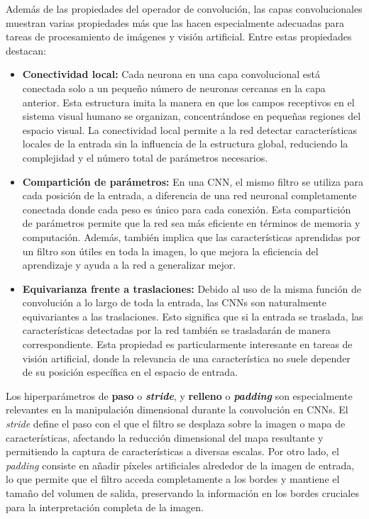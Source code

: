 Además de las propiedades del operador de convolución, las capas convolucionales muestran varias propiedades más que las hacen especialmente adecuadas para tareas de procesamiento de imágenes y visión artificial. Entre estas propiedades destacan:

\begin{itemize}
	\item \textbf{Conectividad local:}
	Cada neurona en una capa convolucional está conectada solo a un pequeño número de neuronas cercanas en la capa anterior. Esta estructura imita la manera en que los campos receptivos en el sistema visual humano se organizan, concentrándose en pequeñas regiones del espacio visual. La conectividad local permite a la red detectar características locales de la entrada sin la influencia de la estructura global, reduciendo la complejidad y el número total de parámetros necesarios.
	
	\item \textbf{Compartición de parámetros:}
	En una CNN, el mismo filtro se utiliza para cada posición de la entrada, a diferencia de una red neuronal completamente conectada donde cada peso es único para cada conexión. Esta compartición de parámetros permite que la red sea más eficiente en términos de memoria y computación. Además, también implica que las características aprendidas por un filtro son útiles en toda la imagen, lo que mejora la eficiencia del aprendizaje y ayuda a la red a generalizar mejor.
	
	\item \textbf{Equivarianza frente a traslaciones:}
	Debido al uso de la misma función de convolución a lo largo de toda la entrada, las CNNs son naturalmente equivariantes a las traslaciones. Esto significa que si la entrada se traslada, las características detectadas por la red también se trasladarán de manera correspondiente. Esta propiedad es particularmente interesante en tareas de visión artificial, donde la relevancia de una característica no suele depender de su posición específica en el espacio de entrada.
\end{itemize}

Los hiperparámetros de \textbf{paso} o \textbf{\textit{stride}}, y \textbf{relleno} o \textbf{\textit{padding}} son especialmente relevantes en la manipulación dimensional durante la convolución en CNNs. El \textit{stride} define el paso con el que el filtro se desplaza sobre la imagen o mapa de características, afectando la reducción dimensional del mapa resultante y permitiendo la captura de características a diversas escalas. Por otro lado, el \textit{padding} consiste en añadir píxeles artificiales alrededor de la imagen de entrada, lo que permite que el filtro acceda completamente a los bordes y mantiene el tamaño del volumen de salida, preservando la información en los bordes cruciales para la interpretación completa de la imagen.

